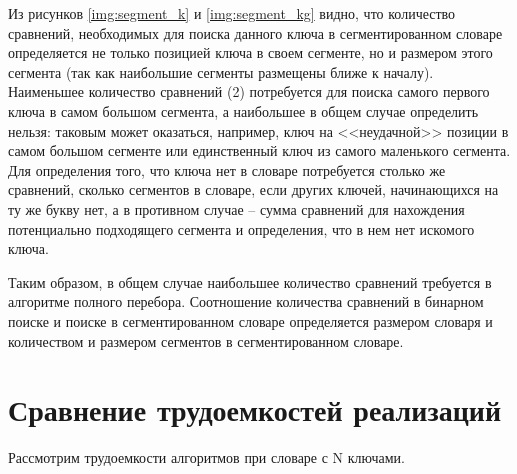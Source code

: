Из рисунков \ref{img:segment_k} и \ref{img:segment_kg} видно, что количество сравнений, необходимых для поиска данного ключа в сегментированном словаре определяется не только позицией ключа в своем сегменте, но и размером этого сегмента (так как наибольшие сегменты размещены ближе к началу). Наименьшее количество сравнений (2) потребуется для поиска самого первого ключа в самом большом сегмента, а наибольшее в общем случае определить нельзя: таковым может оказаться, например, ключ на <<неудачной>> позиции в самом большом сегменте или единственный ключ из самого маленького сегмента. Для определения того, что ключа нет в словаре потребуется столько же сравнений, сколько сегментов в словаре, если других ключей, начинающихся на ту же букву нет, а в противном случае -- сумма сравнений для нахождения потенциально подходящего сегмента и определения, что в нем нет искомого ключа.

Таким образом, в общем случае наибольшее количество сравнений требуется в алгоритме полного перебора. Соотношение количества сравнений в бинарном поиске и поиске в сегментированном словаре определяется размером словаря и количеством и размером сегментов в сегментированном словаре.

\clearpage
\section{Сравнение трудоемкостей реализаций}

Рассмотрим трудоемкости алгоритмов при словаре с N ключами.

